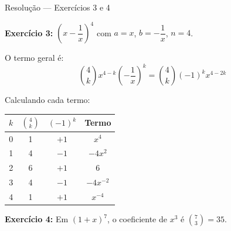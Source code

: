 \documentclass[9pt]{beamer}
\begin{document}
\begin{frame}{Resolução — Exercícios 3 e 4}

\textbf{Exercício 3:} $\left(x - \dfrac{1}{x}\right)^4$ com $a=x$, $b = -\dfrac{1}{x}$, $n=4$.

O termo geral é:
\[
\binom{4}{k} x^{4-k}\left(-\frac{1}{x}\right)^k = \binom{4}{k}(-1)^k x^{4-2k}
\]

Calculando cada termo:
\begin{center}
\begin{tabular}{cccc}
\hline
$k$ & $\binom{4}{k}$ & $(-1)^k$ & Termo \\
\hline
0 & 1 & $+1$ & $x^4$ \\
1 & 4 & $-1$ & $-4x^2$ \\
2 & 6 & $+1$ & $6$ \\
3 & 4 & $-1$ & $-4x^{-2}$ \\
4 & 1 & $+1$ & $x^{-4}$ \\
\hline
\end{tabular}
\end{center}

\vspace{0.2cm}

\textbf{Exercício 4:} Em $(1+x)^7$, o coeficiente de $x^3$ é $\binom{7}{3} = 35$.
\end{frame}

\end{document}
